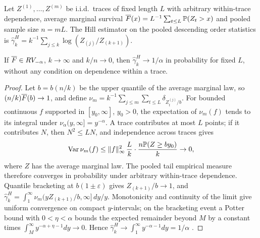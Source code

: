 Let $Z^{(1)},\dots,Z^{(m)}$ be i.i.d.\ traces of fixed length $L$ with arbitrary within-trace dependence, average marginal survival $\overline{F}(x)=L^{-1}\sum_{t\le L}\mathbb{P}(Z_t>x)$ and pooled sample size $n=mL$. The Hill estimator on the pooled descending order statistics is $\hat\gamma_k^H=k^{-1}\sum_{j\le k}\log(Z_{(j)}/Z_{(k+1)})$.

\begin{theorem}\label{thm:hill}
If $\overline{F}\in RV_{-\alpha}$, $k\to\infty$ and $k/n\to0$, then $\hat\gamma_k^H\to1/\alpha$ in probability for fixed $L$, without any condition on dependence within a trace.
\end{theorem}

\begin{proof}
Let $b=b(n/k)$ be the upper quantile of the average marginal law, so $(n/k)\overline{F}(b)\to1$, and define $\nu_m=k^{-1}\sum_{j\le m}\sum_{t\le L}\delta_{Z_t^{(j)}/b}$. For bounded continuous $f$ supported in $[y_0,\infty]$, $y_0>0$, the expectation of $\nu_m(f)$ tends to its integral under $\nu_\alpha(y,\infty]=y^{-\alpha}$. A trace contributes at most $L$ points; if it contributes $N$, then $N^2\le LN$, and independence across traces gives
\begin{equation}\label{eq:varnu}
\operatorname{Var}\nu_m(f)\le\|f\|_\infty^2\,\frac{L}{k}\cdot\frac{n\mathbb{P}(Z\ge by_0)}{k}\to0,
\end{equation}
where $Z$ has the average marginal law. The pooled tail empirical measure therefore converges in probability under arbitrary within-trace dependence. Quantile bracketing at $b(1\pm\varepsilon)$ gives $Z_{(k+1)}/b\to1$, and $\hat\gamma_k^H=\int_1^\infty\nu_m(yZ_{(k+1)}/b,\infty]\,dy/y$. Monotonicity and continuity of the limit give uniform convergence on compact $y$-intervals; on the bracketing event a Potter bound with $0<\eta<\alpha$ bounds the expected remainder beyond $M$ by a constant times $\int_M^\infty y^{-\alpha+\eta-1}dy\to0$. Hence $\hat\gamma_k^H\to\int_1^\infty y^{-\alpha-1}dy=1/\alpha$ \citep{resnick2007}.
\end{proof}

